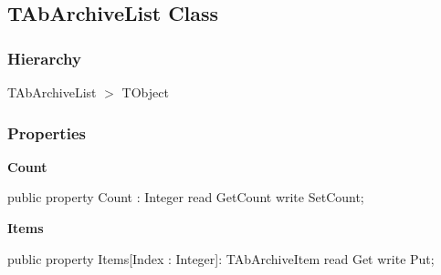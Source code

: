 \documentclass{report}
\newif\ifpdf
\begin{document}
\subsection*{TAbArchiveList Class}
\fi
\label{AbArcTyp.TAbArchiveList}
\subsubsection*{\large{\textbf{Hierarchy}}\normalsize\hspace{1ex}\hfill}
TAbArchiveList {$>$} TObject
\subsubsection*{\large{\textbf{Properties}}\normalsize\hspace{1ex}\hfill}
\begin{list}{}{
\setlength{\itemindent}{0cm}
\setlength{\listparindent}{0cm}
\setlength{\leftmargin}{\evensidemargin}
\addtolength{\leftmargin}{\tmplength}
\settowidth{\labelsep}{X}
\addtolength{\leftmargin}{\labelsep}
\setlength{\labelwidth}{\tmplength}
}
\label{AbArcTyp.TAbArchiveList-Count}
\item[\textbf{Count}\hfill]
\ifpdf
\begin{flushleft}
\fi
\begin{ttfamily}
public property Count : Integer
      read GetCount
      write SetCount;\end{ttfamily}

\ifpdf
\end{flushleft}
\fi


\par  \label{AbArcTyp.TAbArchiveList-Items}
\item[\textbf{Items}\hfill]
\ifpdf
\begin{flushleft}
\fi
\begin{ttfamily}
public property Items[Index : Integer]: TAbArchiveItem
      read Get
      write Put;\end{ttfamily}

\ifpdf
\end{flushleft}
\fi


\par  \end{list}
\end{document}
